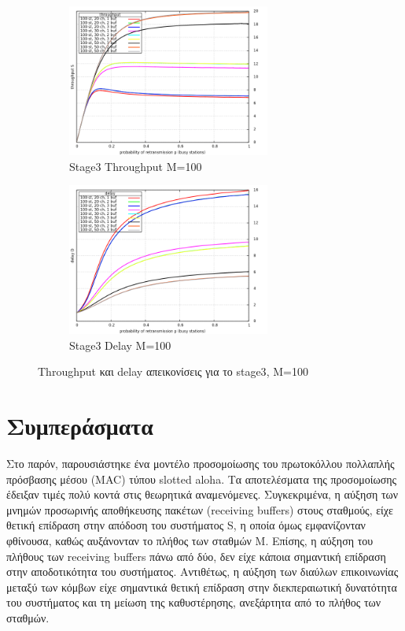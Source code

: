 \documentclass[12pt]{report}
\begin{document}
\begin{figure}[h]
\begin{subfigure}{0.5\textwidth}
\includegraphics[width=0.9\linewidth, height=5cm]{st3_throughput_M100} 
\caption{\textlatin{Stage3 Throughput M=100}}
\label{fig:st3_throughput_100}
\end{subfigure}
\begin{subfigure}{0.5\textwidth}
\includegraphics[width=0.9\linewidth, height=5cm]{st3_delay_M100}
\caption{\textlatin{Stage3 Delay M=100}}
\label{fig:st3_delay_100}
\end{subfigure}
 
\caption{\textlatin{Throughput} και \textlatin{delay} απεικονίσεις για το \textlatin{stage3}, M=100}
\label{fig:Stage3_100}
\end{figure}

\section{Συμπεράσματα}
Στο παρόν, παρουσιάστηκε ένα μοντέλο προσομοίωσης του πρωτοκόλλου πολλαπλής πρόσβασης μέσου (\textlatin{MAC}) τύπου \textlatin{slotted aloha}. Τα αποτελέσματα της προσομοίωσης έδειξαν τιμές πολύ κοντά στις θεωρητικά αναμενόμενες. Συγκεκριμένα, η αύξηση των μνημών προσωρινής αποθήκευσης πακέτων (\textlatin{receiving buffers}) στους σταθμούς, είχε θετική επίδραση στην απόδοση του συστήματος \textlatin{S}, η οποία όμως εμφανίζονταν φθίνουσα, καθώς αυξάνονταν το πλήθος των σταθμών \textlatin{M}. Επίσης, η αύξηση του πλήθους των \textlatin{receiving buffers} πάνω από δύο, δεν είχε κάποια σημαντική επίδραση στην αποδοτικότητα του συστήματος. Αντιθέτως, η αύξηση των διαύλων επικοινωνίας μεταξύ των κόμβων είχε σημαντικά θετική επίδραση στην διεκπεραιωτική δυνατότητα του συστήματος και τη μείωση της καθυστέρησης, ανεξάρτητα από το πλήθος των σταθμών.
\end{document}
